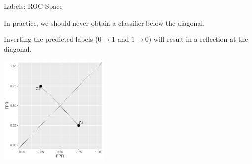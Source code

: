 \documentclass[11pt,compress,t,notes=noshow, xcolor=table]{beamer}
\newenvironment{knitrout}{}{} %
\begin{document}
\begin{vbframe}{Labels: ROC Space}

In practice, we should never obtain a classifier below the diagonal.\\

\lz

Inverting the predicted labels ($0 \rightarrow 1$ and $1 \rightarrow 0$) will result in a reflection at the diagonal.

\lz

\begin{knitrout}\scriptsize
{}\color{fgcolor}

{\centering \includegraphics[width=0.4\textwidth]{figure/eval_mclass_roc_sp_3}

}



\end{knitrout}
\end{vbframe}
\end{document}
